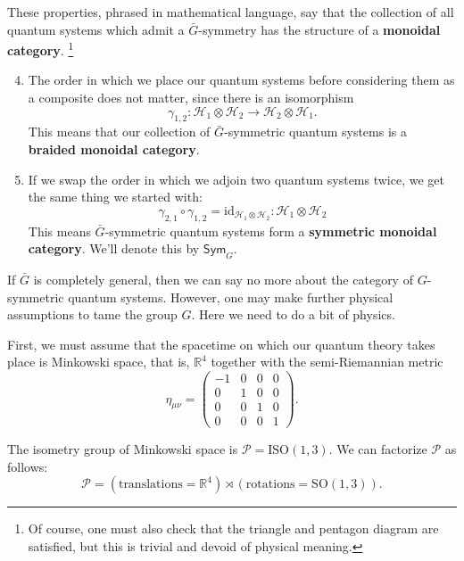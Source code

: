 \documentclass[a4paper,10pt]{scrreprt}
\newcommand{\R}{\mathbb{R}}
\theoremstyle{definition}
\theoremstyle{plain}
\theoremstyle{remark}
\begin{document}
These properties, phrased in mathematical language, say that the collection of all quantum systems which admit a $\bar{G}$-symmetry has the structure of a \textbf{monoidal category}. \footnote{Of course, one must also check that the triangle and pentagon diagram are satisfied, but this is trivial and devoid of physical meaning.} 

\begin{enumerate}
    \setcounter{enumi}{3}
  \item The order in which we place our quantum systems before considering them as a composite does not matter, since there is an isomorphism
    \begin{equation*}
      \gamma_{1,2}\colon \mathscr{H}_{1} \otimes \mathscr{H}_{2} \to \mathscr{H}_{2} \otimes \mathscr{H}_{1}.
    \end{equation*}
    This means that our collection of $\bar{G}$-symmetric quantum systems is a \textbf{braided monoidal category}.

  \item If we swap the order in which we adjoin two quantum systems twice, we get the same thing we started with:
    \begin{equation*}
      \gamma_{2,1} \circ \gamma_{1,2} = \mathrm{id}_{\mathscr{H}_{1} \otimes \mathscr{H}_{2}} \colon \mathscr{H}_{1} \otimes \mathscr{H}_{2}
    \end{equation*}
    This means $\bar{G}$-symmetric quantum systems form a \textbf{symmetric monoidal category}. We'll denote this by $\mathsf{Sym}_{G}$.
\end{enumerate}

If $\bar{G}$ is completely general, then we can say no more about the category of $G$-symmetric quantum systems. However, one may make further physical assumptions to tame the group $G$. Here we need to do a bit of physics.

First, we must assume that the spacetime on which our quantum theory takes place is Minkowski space, that is, $\R^{4}$ together with the semi-Riemannian metric
\begin{equation*}
  \eta_{\mu\nu} =
  \begin{pmatrix}
    -1 & 0 & 0 & 0 \\
    0 & 1 & 0 & 0 \\
    0 & 0 & 1 & 0 \\
    0 & 0 & 0 & 1
  \end{pmatrix}.
\end{equation*}

The isometry group of Minkowski space is $\mathcal{P} = \mathrm{ISO}(1, 3)$. We can factorize $\mathcal{P}$ as follows:
\begin{equation*}
  \mathcal{P} = \left( \text{translations} = \R^{4} \right) \rtimes \left( \text{rotations} = \mathrm{SO}(1, 3) \right).
\end{equation*}
\end{document}
